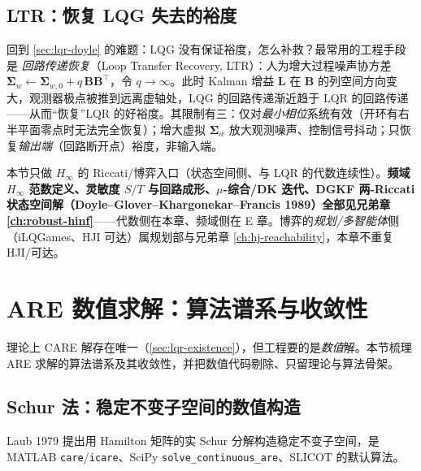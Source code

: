 \subsection{LTR：恢复 LQG 失去的裕度}
\label{sec:lqr-ltr}

回到 \cref{sec:lqr-doyle} 的难题：LQG 没有保证裕度，怎么补救？最常用的工程手段是 \emph{回路传递恢复}（Loop Transfer Recovery, LTR）：人为增大过程噪声协方差 $\boldsymbol\Sigma_w\leftarrow\boldsymbol\Sigma_{w,0}+q\,\mathbf B\mathbf B^\top$，令 $q\to\infty$。此时 Kalman 增益 $\mathbf L$ 在 $\mathbf B$ 的列空间方向变大，观测器极点被推到远离虚轴处，LQG 的回路传递渐近趋于 LQR 的回路传递——从而“恢复”LQR 的好裕度。其限制有三：仅对\emph{最小相位}系统有效（开环有右半平面零点时无法完全恢复）；增大虚拟 $\boldsymbol\Sigma_w$ 放大观测噪声、控制信号抖动；只恢复\emph{输出端}（回路断开点）裕度，非输入端。

\begin{remark}[分工声明]
本节只做 $H_\infty$ 的 Riccati/博弈入口（状态空间侧、与 LQR 的代数连续性）。\textbf{频域 $H_\infty$ 范数定义、灵敏度 $S/T$ 与回路成形、$\mu$-综合/DK 迭代、DGKF 两-Riccati 状态空间解（Doyle--Glover--Khargonekar--Francis 1989\cite{doyle1989dgkf}）全部见兄弟章 \cref{ch:robust-hinf}}——代数侧在本章、频域侧在 E 章。博弈的\emph{规划/多智能体}侧（iLQGames、HJI 可达）属规划部与兄弟章 \cref{ch:hj-reachability}，本章不重复 HJI/可达。
\end{remark}

\section{ARE 数值求解：算法谱系与收敛性}
\label{sec:lqr-numerics}

理论上 CARE 解存在唯一（\cref{sec:lqr-existence}），但工程要的是\emph{数值}解。本节梳理 ARE 求解的算法谱系及其收敛性，并把数值代码剔除、只留理论与算法骨架。

\subsection{Schur 法：稳定不变子空间的数值构造}
\label{sec:lqr-schur}

Laub 1979\cite{laub1979schur} 提出用 Hamilton 矩阵的实 Schur 分解构造稳定不变子空间，是 MATLAB \texttt{care}/\allowbreak\texttt{icare}、SciPy \texttt{solve\_continuous\_are}、SLICOT 的默认算法。

